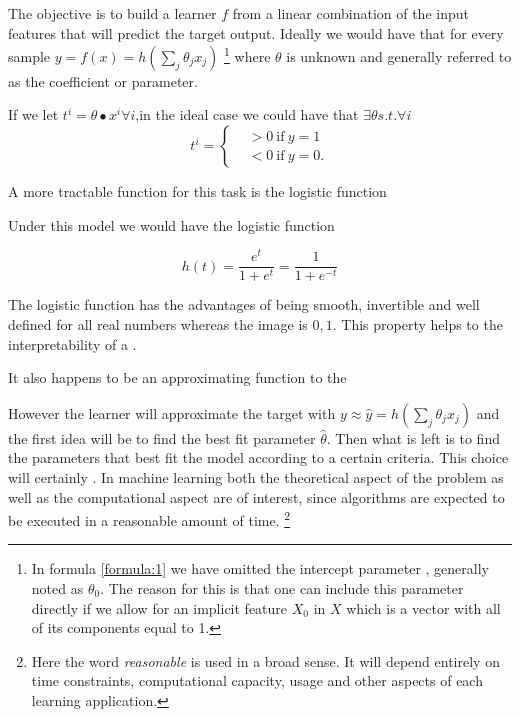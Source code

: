 The objective is to build a learner $f$ from a linear combination of the input features that will predict the target output. Ideally we would have that for every sample $y = f(x) = h\left(\sum_{j}\theta_jx_j\right)$ \label{formula:1} \footnote{In formula \ref{formula:1} we have omitted the intercept parameter , generally noted as $\theta_0$. The reason for this is that one can include this parameter directly if we allow for an implicit feature $X_0$ in $X$ which is a vector with all of its components equal to 1.  } where $\theta$ is unknown and generally referred to as the coefficient or parameter. 

If we let $ t^i = \theta \bullet x^i \forall i $,in the ideal case we could have that $\exists \theta s.t. \forall i $ 
\[
    t^i =
      \begin{cases}
        &>0 \ \mbox{if} \ y=1 \\
        &<0 \ \mbox{if} \ y=0.
      \end{cases}
    \]


A more tractable function for this task is the logistic function

Under this model we would have the logistic function

\begin{equation} \label{eq:logit}
h(t)  = \frac{e^{t}}{1 + e^{t}} = \frac{1}{1 + e^{-t}}  

\end{equation}

The logistic function has the advantages of being smooth, invertible and well defined for all real numbers whereas the image is ${0,1}$. This property helps to the interpretability of a  . 

It also happens to be an approximating function to the



However the learner will approximate the target with $y \approx \hat{y} = h\left(\sum_{j}\theta_jx_j\right)$ and the first idea will be to find the best fit parameter $\hat{\theta}$. Then what is left is to find the parameters that best fit the model according to a certain criteria. This choice will certainly . In machine learning both the theoretical aspect of the problem as well as the computational aspect are of interest, since algorithms are expected to be executed in a reasonable amount of time. \footnote{Here the word \textit{reasonable} is used in a broad sense. It will depend entirely on time constraints, computational capacity, usage and other aspects of each learning application.}

